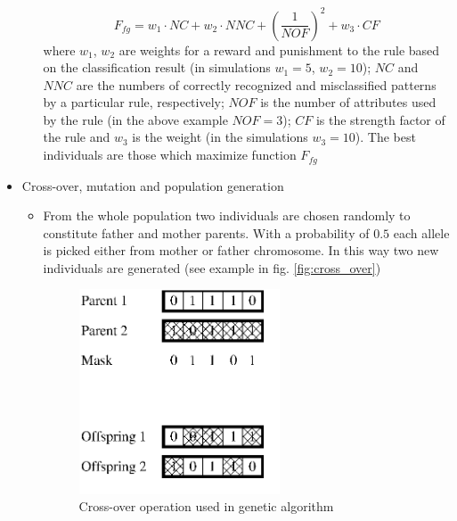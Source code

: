 \begin{itemize}
\begin{itemize}
                \begin{equation}
                    F_{fg} = w_1\cdot NC + w_2\cdot NNC + (\frac{1}{NOF})^2 +
                    w_3\cdot CF
                    \label{eq:fuzzy_fitness}
                \end{equation}
                where $w_1$, $w_2$ are weights for a reward and punishment to
                the rule based on the classification result (in simulations
                $w_1=5$, $w_2=10$); $NC$ and $NNC$ are
                the numbers of correctly recognized and misclassified patterns
                by a particular rule, respectively; $NOF$ is the number of
                attributes used by the rule (in the above example $NOF=3$);
                $CF$ is the strength factor of the rule and $w_3$ is the
                weight (in the simulations $w_3=10$).
                The best individuals are those which maximize function $F_{fg}$
        \end{itemize}
    \item Cross-over, mutation and population generation
        \begin{itemize}
            \item From the whole population two individuals are chosen
                randomly to constitute father and mother parents. With a
                probability of $0.5$ each allele is picked either from mother
                or father chromosome. In this way two new
                individuals are generated (see example in fig. \ref{fig:cross_over})
                \begin{figure}[H]
                    \begin{center}
                        \includegraphics[width=0.6\textwidth, height=0.5\textwidth]{fig/cross_over.png}
                    \end{center}
                    \caption{Cross-over operation used in genetic algorithm}

\end{figure}
\end{itemize}
\end{itemize}
